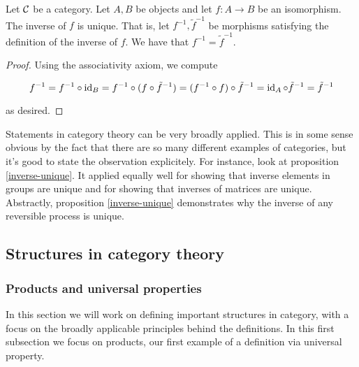 \begin{prop}
\label{inverse-unique}
Let ${\mathcal C}$ be a category. Let $A,B$ be objects and let $f:A\to B$ be an isomorphism. The inverse of $f$ is unique. That is, let $f^{-1},\tilde{f}^{-1}$ be morphisms satisfying the definition of the inverse of $f$. We have that $f^{-1}=\tilde{f}^{-1}$.
\end{prop}
\begin{proof} Using the associativity axiom, we compute

$$f^{-1}=f^{-1}\circ \operatorname{id} _{B} = f^{-1}\circ (f \circ \tilde{f}^{-1})=(f^{-1}\circ f)\circ \tilde{f}^{-1}=\operatorname{id}_A \circ \tilde{f}^{-1}=\tilde{f}^{-1}$$

as desired.
\end{proof}

\begin{rem} Statements in category theory can be very broadly applied. This is in some sense obvious by the fact that there are so many different examples of categories, but it's good to state the observation explicitely. For instance, look at proposition \ref{inverse-unique}. It applied equally well for showing that inverse elements in groups are unique and for showing that inverses of matrices are unique. Abstractly, proposition \ref{inverse-unique} demonstrates why the inverse of any reversible process is unique.
\end{rem}

\subsection{Structures in category theory}

\subsubsection{Products and universal properties}

In this section we will work on defining important structures in category, with a focus on the broadly applicable principles behind the definitions. In this first subsection we focus on products, our first example of a definition via universal property.

